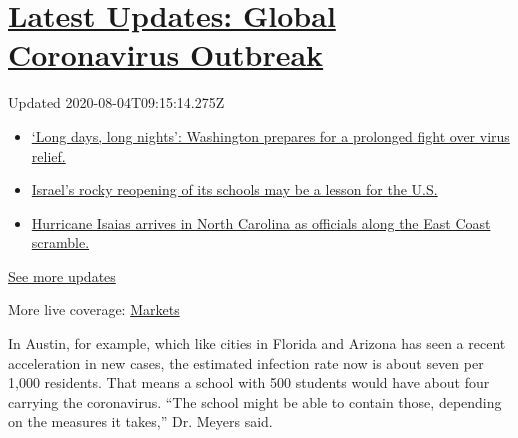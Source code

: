 \hypertarget{latest-updates-global-coronavirus-outbreak}{%
\section{\texorpdfstring{\href{https://www.nytimes3xbfgragh.onion/2020/08/04/world/coronavirus-covid-19.html?action=click\&pgtype=Article\&state=default\&region=MAIN_CONTENT_1\&context=storylines_live_updates}{Latest
Updates: Global Coronavirus
Outbreak}}{Latest Updates: Global Coronavirus Outbreak}}\label{latest-updates-global-coronavirus-outbreak}}

Updated 2020-08-04T09:15:14.275Z

\begin{itemize}
\tightlist
\item
  \href{https://www.nytimes3xbfgragh.onion/2020/08/04/world/coronavirus-covid-19.html?action=click\&pgtype=Article\&state=default\&region=MAIN_CONTENT_1\&context=storylines_live_updates\#link-6b644638}{`Long
  days, long nights': Washington prepares for a prolonged fight over
  virus relief.}
\item
  \href{https://www.nytimes3xbfgragh.onion/2020/08/04/world/coronavirus-covid-19.html?action=click\&pgtype=Article\&state=default\&region=MAIN_CONTENT_1\&context=storylines_live_updates\#link-7af9fca0}{Israel's
  rocky reopening of its schools may be a lesson for the U.S.}
\item
  \href{https://www.nytimes3xbfgragh.onion/2020/08/04/world/coronavirus-covid-19.html?action=click\&pgtype=Article\&state=default\&region=MAIN_CONTENT_1\&context=storylines_live_updates\#link-33bf9168}{Hurricane
  Isaias arrives in North Carolina as officials along the East Coast
  scramble.}
\end{itemize}

\href{https://www.nytimes3xbfgragh.onion/2020/08/04/world/coronavirus-covid-19.html?action=click\&pgtype=Article\&state=default\&region=MAIN_CONTENT_1\&context=storylines_live_updates}{See
more updates}

More live coverage:
\href{https://www.nytimes3xbfgragh.onion/live/2020/08/03/business/stock-market-today-coronavirus?action=click\&pgtype=Article\&state=default\&region=MAIN_CONTENT_1\&context=storylines_live_updates}{Markets}

In Austin, for example, which like cities in Florida and Arizona has
seen a recent acceleration in new cases, the estimated infection rate
now is about seven per 1,000 residents. That means a school with 500
students would have about four carrying the coronavirus. ``The school
might be able to contain those, depending on the measures it takes,''
Dr. Meyers said.

